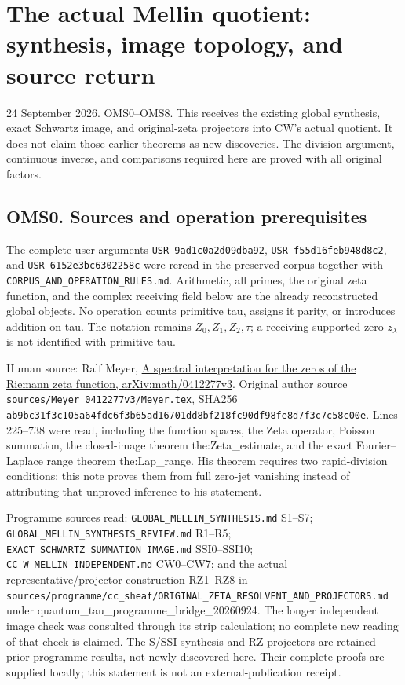 \section{The actual Mellin quotient: synthesis, image topology, and
source
return}\label{the-actual-mellin-quotient-synthesis-image-topology-and-source-return}

24 September 2026. OMS0--OMS8. This receives the existing global
synthesis, exact Schwartz image, and original-zeta projectors into CW's
actual quotient. It does not claim those earlier theorems as new
discoveries. The division argument, continuous inverse, and comparisons
required here are proved with all original factors.

\subsection{OMS0. Sources and operation
prerequisites}\label{oms0.-sources-and-operation-prerequisites}

The complete user arguments \nolinkurl{USR-9ad1c0a2d09dba92}, \nolinkurl{USR-f55d16feb948d8c2},
and \nolinkurl{USR-6152e3bc6302258c} were reread in the preserved corpus together
with \nolinkurl{CORPUS_AND_OPERATION_RULES.md}. Arithmetic, all primes, the
original zeta function, and the complex receiving field below are the
already reconstructed global objects. No operation counts primitive tau,
assigns it parity, or introduces addition on tau. The notation remains
\(Z_0,Z_1,Z_2,\tau\); a receiving supported zero \(z_\lambda\) is not
identified with primitive tau.

Human source: Ralf Meyer, \href{https://arxiv.org/abs/math/0412277v3}{A
spectral interpretation for the zeros of the Riemann zeta function,
arXiv:math/0412277v3}. Original author source
\nolinkurl{sources/Meyer_0412277v3/Meyer.tex}, SHA256
\nolinkurl{ab9bc31f3c105a64fdc6f3b65ad16701dd8bf218fc90df98fe8d7f3c7c58c00e}. Lines
225--738 were read, including the function spaces, the Zeta operator,
Poisson summation, the closed-image theorem the:Zeta\_estimate, and the
exact Fourier--Laplace range theorem the:Lap\_range. His theorem
requires two rapid-division conditions; this note proves them from full
zero-jet vanishing instead of attributing that unproved inference to his
statement.

Programme sources read: \nolinkurl{GLOBAL_MELLIN_SYNTHESIS.md} S1--S7;
\nolinkurl{GLOBAL_MELLIN_SYNTHESIS_REVIEW.md} R1--R5;
\nolinkurl{EXACT_SCHWARTZ_SUMMATION_IMAGE.md} SSI0--SSI10;
\nolinkurl{CC_W_MELLIN_INDEPENDENT.md} CW0--CW7; and the actual
representative/projector construction RZ1--RZ8 in
\nolinkurl{sources/programme/cc_sheaf/ORIGINAL_ZETA_RESOLVENT_AND_PROJECTORS.md}
under quantum\_tau\_programme\_bridge\_20260924. The longer independent
image check was consulted through its strip calculation; no complete new
reading of that check is claimed. The S/SSI synthesis and RZ projectors
are retained prior programme results, not newly discovered here. Their
complete proofs are supplied locally; this statement is not an
external-publication receipt.

